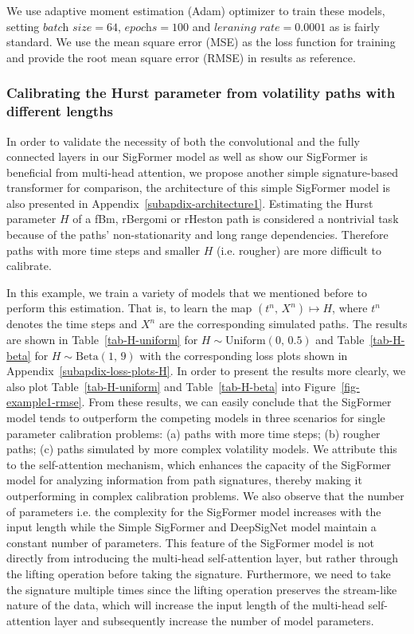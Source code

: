 \documentclass[]{article}
\renewcommand{\(}{\left(}
\renewcommand{\)}{\right)}
\begin{document}
	We use adaptive moment estimation (Adam) optimizer to train these models, setting $\textit{batch size}=64$, $\textit{epochs}=100$ and $\textit{leraning rate}=0.0001$ as is fairly standard. We use the mean square error (MSE) as the loss function for training and provide the root mean square error (RMSE) in results as reference.
	
	\subsubsection{Calibrating the Hurst parameter from volatility paths with different lengths}
	\label{subsubsec-single-different}
	In order to validate the necessity of both the convolutional and the fully connected layers in our SigFormer model as well as show our SigFormer is beneficial from multi-head attention, we propose another simple signature-based transformer for comparison, the architecture of this simple SigFormer model is also presented in Appendix~\ref{subapdix-architecture1}. Estimating the Hurst parameter $H$ of a fBm, rBergomi or rHeston path is considered a nontrivial task because of the paths’ non-stationarity and long range dependencies. Therefore paths with more time steps and smaller $H$ (i.e. rougher) are more difficult to calibrate. 
	
	In this example, we train a variety of models that we mentioned before to perform this estimation. That is, to learn the map $(t^n,\,X^n)\mapsto H$, where $t^n$ denotes the time steps and $X^n$ are the corresponding simulated paths. The results are shown in Table~\ref{tab-H-uniform} for $H\sim\text{Uniform}(0,\,0.5)$ and Table~\ref{tab-H-beta} for $H\sim\text{Beta}(1,\,9)$ with the corresponding loss plots shown in Appendix~\ref{subapdix-loss-plots-H}. In order to present the results more clearly, we also plot Table~\ref{tab-H-uniform} and Table~\ref{tab-H-beta} into Figure~\ref{fig-example1-rmse}. 
	From these results, we can easily conclude that the SigFormer model tends to outperform the competing models in three scenarios for single parameter calibration problems: (a) paths with more time steps; (b) rougher paths; (c) paths simulated by more complex volatility models. We attribute this to the self-attention mechanism, which enhances the capacity of the SigFormer model for analyzing information from path signatures, thereby making it outperforming in complex calibration problems. 
	We also observe that the number of parameters i.e. the complexity for the SigFormer model increases with the input length while the Simple SigFormer and DeepSigNet model maintain a constant number of parameters. This feature of the SigFormer model is not directly from introducing the multi-head self-attention layer, but rather through the lifting operation before taking the signature. Furthermore, we need to take the signature multiple times since the lifting operation preserves the stream-like nature of the data, which will increase the input length of the multi-head self-attention layer and subsequently increase the number of model parameters.
	
\end{document}
